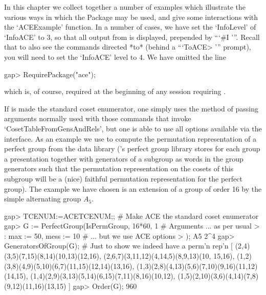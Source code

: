 

In this chapter  we  collect  together  a  number  of  examples  which
illustrate the various ways in which the {\ACE} Package may  be  used,
and give some interactions with the `ACEExample' function. In a number
of cases, we have set the `InfoLevel' of `InfoACE' to 3, so  that  all
output from {\ACE} is displayed, prepended by ```\#I  '''. Recall that
to also see the commands directed *to* {\ACE} (behind a  ```ToACE> '''
prompt), you will need to set  the  `InfoACE'  level  to  4.  We  have
omitted the line

\beginexample
gap> RequirePackage("ace");
\endexample

which is,  of  course,  required  at  the  beginning  of  any  session
requiring {\ACE}.


If {\ACE} is made the standard coset enumerator, one simply  uses  the
method of passing arguments normally used  with  those  commands  that
invoke `CosetTableFromGensAndRels', but one is able to use all options
available via the {\ACE} interface. As an example  we  use  {\ACE}  to
compute the permutation representation of a  perfect  group  from  the
data library ({\GAP}'s perfect group library stores for each  group  a
presentation together with generators of a subgroup as  words  in  the
group generators such  that  the  permutation  representation  on  the
cosets  of  this  subgroup  will  be  a  (nice)  faithful  permutation
representation for the perfect group). The example we have  chosen  is
an extension of a group of order 16 by the  simple  alternating  group
$A_5$.

\beginexample
gap> TCENUM:=ACETCENUM;; # Make ACE the standard coset enumerator
gap> G := PerfectGroup(IsPermGroup, 16*60, 1   # Arguments ... as per usual
>                      : max := 50, mess := 10 # ... but we use ACE options
>                      );
A5 2^4
gap> GeneratorsOfGroup(G); # Just to show we indeed have a perm'n rep'n
[ (2,4)(3,5)(7,15)(8,14)(10,13)(12,16), (2,6,7)(3,11,12)(4,14,5)(8,9,13)(10,
    15,16), (1,2)(3,8)(4,9)(5,10)(6,7)(11,15)(12,14)(13,16), 
  (1,3)(2,8)(4,13)(5,6)(7,10)(9,16)(11,12)(14,15), 
  (1,4)(2,9)(3,13)(5,14)(6,15)(7,11)(8,16)(10,12), 
  (1,5)(2,10)(3,6)(4,14)(7,8)(9,12)(11,16)(13,15) ]
gap> Order(G);
960
\endexample

